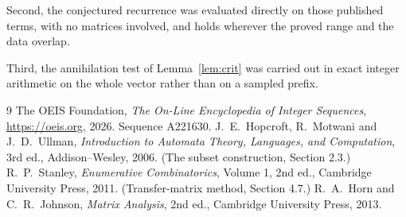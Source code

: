 \documentclass[11pt,a4paper]{article}
\theoremstyle{plain}
\theoremstyle{definition}
\begin{document}
Second, the conjectured recurrence was evaluated directly on those published terms, with no
matrices involved, and holds wherever the proved range and the data overlap.

Third, the annihilation test of Lemma~\ref{lem:crit} was carried out in exact integer
arithmetic on the whole vector rather than on a sampled prefix.

\begin{thebibliography}{9}
 The OEIS Foundation, \emph{The On-Line Encyclopedia of Integer
Sequences}, \url{https://oeis.org}, 2026. Sequence A221630.
 J.~E.~Hopcroft, R.~Motwani and J.~D.~Ullman, \emph{Introduction to Automata
Theory, Languages, and Computation}, 3rd ed., Addison--Wesley, 2006. (The subset
construction, Section 2.3.)
 R.~P.~Stanley, \emph{Enumerative Combinatorics}, Volume 1, 2nd ed.,
Cambridge University Press, 2011. (Transfer-matrix method, Section 4.7.)
 R.~A.~Horn and C.~R.~Johnson, \emph{Matrix Analysis}, 2nd ed., Cambridge
University Press, 2013.
\end{thebibliography}
\end{document}
